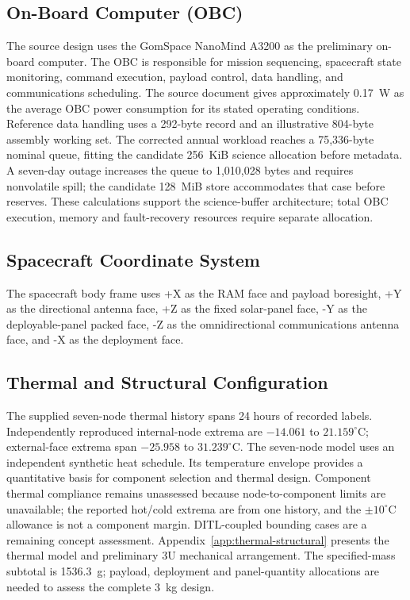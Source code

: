 
\subsection{On-Board Computer (OBC)}\label{on-board-computer-obc}
The source design uses the GomSpace NanoMind A3200 as the preliminary on-board computer. The OBC is responsible for mission sequencing, spacecraft state monitoring, command execution, payload control, data handling, and communications scheduling. The source document gives approximately 0.17~W as the average OBC power consumption for its stated operating conditions. Reference data handling uses a 292-byte record and an illustrative 804-byte assembly working set. The corrected annual workload reaches a 75,336-byte nominal queue, fitting the candidate 256~KiB science allocation before metadata. A seven-day outage increases the queue to 1,010,028 bytes and requires nonvolatile spill; the candidate 128~MiB store accommodates that case before reserves. These calculations support the science-buffer architecture; total OBC execution, memory and fault-recovery resources require separate allocation.


\subsection{Spacecraft Coordinate System}\label{spacecraft-coordinate-system}
The spacecraft body frame uses +X as the RAM face and payload boresight, +Y as the directional antenna face, +Z as the fixed solar-panel face, -Y as the deployable-panel packed face, -Z as the omnidirectional communications antenna face, and -X as the deployment face.


\subsection{Thermal and Structural Configuration}\label{sec:thermal-architecture}
The supplied seven-node thermal history spans 24 hours of recorded labels. Independently reproduced internal-node extrema are $-14.061$ to $21.159^\circ$C; external-face extrema span $-25.958$ to $31.239^\circ$C. The seven-node model uses an independent synthetic heat schedule. Its temperature envelope provides a quantitative basis for component selection and thermal design. Component thermal compliance remains unassessed because node-to-component limits are unavailable; the reported hot/cold extrema are from one history, and the $\pm10^\circ$C allowance is not a component margin. DITL-coupled bounding cases are a remaining concept assessment. Appendix~\ref{app:thermal-structural} presents the thermal model and preliminary 3U mechanical arrangement. The specified-mass subtotal is 1536.3~g; payload, deployment and panel-quantity allocations are needed to assess the complete 3~kg design.

